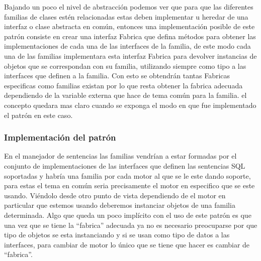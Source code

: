 Bajando un poco el nivel de abstracción podemos ver que para que las diferentes familias de clases estén relacionadas estas deben implementar u heredar de una interfaz o clase abstracta en común, entonces una implementación posible de este patrón consiste en crear una interfaz Fabrica que defina métodos para obtener las implementaciones de cada una de las interfaces de la familia, de este modo cada una de las familias implementara esta interfaz Fabrica para devolver instancias de objetos que se correspondan con su familia, utilizando siempre como tipo a las interfaces que definen a la familia. Con esto se obtendrán tantas Fabricas especificas como familias existan por lo que resta obtener la fabrica adecuada dependiendo de la variable externa que hace de tema común para la familia. el concepto quedara mas claro cuando se exponga el modo en que fue implementado el patrón en este caso.
%
\subsubsection{Implementación del patrón}
En el manejador de sentencias las familias vendrían a estar formadas por el conjunto de implementaciones de las interfaces que definen las sentencias SQL soportadas y habría una familia por cada motor al que se le este dando soporte, para estas el tema en común seria precisamente el motor en especifico que se este usando. Viéndolo desde otro punto de vista dependiendo de el motor en particular que estemos usando deberemos instanciar objetos de una familia determinada. Algo que queda un poco implícito con el uso de este patrón es que una vez que se tiene la ``fabrica'' adecuada ya no es necesario preocuparse por que tipo de objetos se esta instanciando y si se usan como tipo de datos a las interfaces, para cambiar de motor lo único que se tiene que hacer es cambiar de ``fabrica''.

